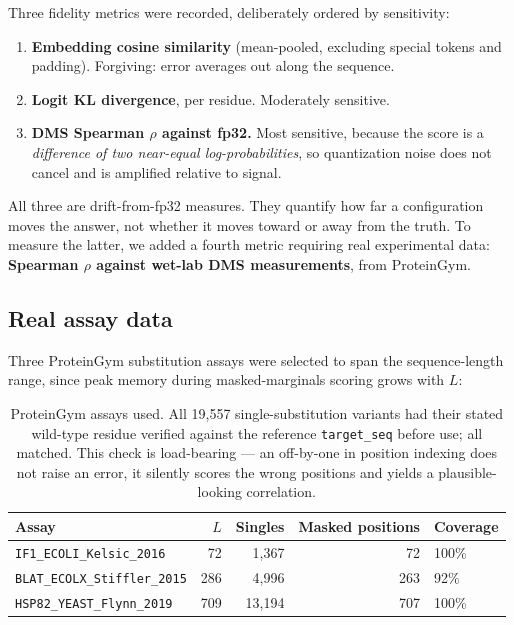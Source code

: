 \documentclass[11pt]{article}
\begin{document}
Three fidelity metrics were recorded, deliberately ordered by sensitivity:

\begin{enumerate}
  \item \textbf{Embedding cosine similarity} (mean-pooled, excluding special
        tokens and padding). Forgiving: error averages out along the sequence.
  \item \textbf{Logit KL divergence}, per residue. Moderately sensitive.
  \item \textbf{DMS Spearman $\rho$ against fp32.} Most sensitive, because the
        score is a \emph{difference of two near-equal log-probabilities}, so
        quantization noise does not cancel and is amplified relative to signal.
\end{enumerate}

All three are drift-from-fp32 measures. They quantify how far a configuration
moves the answer, not whether it moves toward or away from the truth. To measure
the latter, we added a fourth metric requiring real experimental data:
\textbf{Spearman $\rho$ against wet-lab DMS measurements}, from ProteinGym.

\subsection{Real assay data}

Three ProteinGym substitution assays were selected to span the sequence-length
range, since peak memory during masked-marginals scoring grows with $L$:

\begin{table}[htb]
\centering
\caption{ProteinGym assays used. All 19{,}557 single-substitution variants had
their stated wild-type residue verified against the reference \texttt{target\_seq}
before use; all matched. This check is load-bearing --- an off-by-one in
position indexing does not raise an error, it silently scores the wrong
positions and yields a plausible-looking correlation.}
\small
\begin{tabular}{lrrrl}
\toprule
Assay & $L$ & Singles & Masked positions & Coverage \\
\midrule
\texttt{IF1\_ECOLI\_Kelsic\_2016}     &  72 &  1{,}367 &  72 & 100\% \\
\texttt{BLAT\_ECOLX\_Stiffler\_2015}  & 286 &  4{,}996 & 263 &  92\% \\
\texttt{HSP82\_YEAST\_Flynn\_2019}    & 709 & 13{,}194 & 707 & 100\% \\
\bottomrule
\end{tabular}
\end{table}
\end{document}
